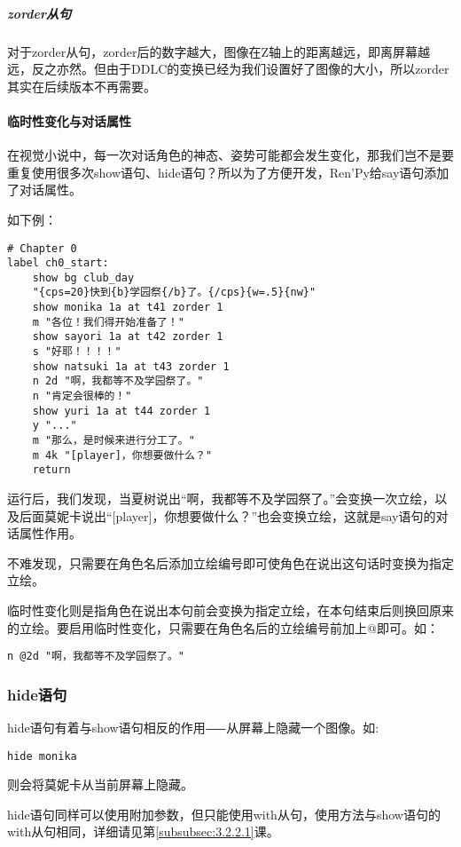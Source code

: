 \subparagraph{zorder从句}
对于zorder从句，zorder后的数字越大，图像在Z轴上的距离越远，即离屏幕越远，反之亦然。但由于DDLC的变换已经为我们设置好了图像的大小，所以zorder其实在后续版本不再需要。

\paragraph{临时性变化与对话属性}
在视觉小说中，每一次对话角色的神态、姿势可能都会发生变化，那我们岂不是要重复使用很多次show语句、hide语句？所以为了方便开发，Ren'Py给say语句添加了对话属性。

如下例：
\begin{lstlisting}
# Chapter 0
label ch0_start:
    show bg club_day
    "{cps=20}快到{b}学园祭{/b}了。{/cps}{w=.5}{nw}"
    show monika 1a at t41 zorder 1
    m "各位！我们得开始准备了！"
    show sayori 1a at t42 zorder 1
    s "好耶！！！！"
    show natsuki 1a at t43 zorder 1
    n 2d "啊，我都等不及学园祭了。"
    n "肯定会很棒的！"
    show yuri 1a at t44 zorder 1
    y "..."
    m "那么，是时候来进行分工了。"
    m 4k "[player]，你想要做什么？"
    return
\end{lstlisting}

运行后，我们发现，当夏树说出“啊，我都等不及学园祭了。”会变换一次立绘，以及后面莫妮卡说出“[player]，你想要做什么？”也会变换立绘，这就是say语句的对话属性作用。

不难发现，只需要在角色名后添加立绘编号即可使角色在说出这句话时变换为指定立绘。

临时性变化则是指角色在说出本句前会变换为指定立绘，在本句结束后则换回原来的立绘。要启用临时性变化，只需要在角色名后的立绘编号前加上@即可。如：
\begin{lstlisting}[numbers=none]
    n @2d "啊，我都等不及学园祭了。"
\end{lstlisting}

\subsubsection{hide语句}

hide语句有着与show语句相反的作用⸺从屏幕上隐藏一个图像。如:

\begin{lstlisting}[numbers=none]
hide monika
\end{lstlisting}

则会将莫妮卡从当前屏幕上隐藏。

hide语句同样可以使用附加参数，但只能使用with从句，使用方法与show语句的with从句相同，详细请见第\ref{subsubsec:3.2.2.1}课。

